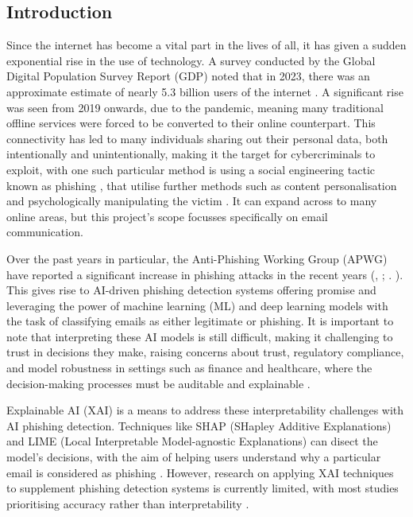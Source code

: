 
\subsection*{Introduction}

Since the internet has become a vital part in the lives of all, it has given a sudden exponential rise in the use of technology. A survey conducted by the Global Digital Population Survey Report (GDP) noted that in 2023, there was an approximate estimate of nearly 5.3 billion users of the internet \citep{kemp2022digital}. A significant rise was seen from 2019 onwards, due to the pandemic, meaning many traditional offline services were forced to be converted to their online counterpart. This connectivity has led to many individuals sharing out their personal data, both intentionally and unintentionally, making it the target for cybercriminals to exploit, with one such particular method is using a social engineering tactic known as phishing \citep{zahra2022detecting}, that utilise further methods such as content personalisation and psychologically manipulating the victim \citep{jagatic2007social}. It can expand across to many online areas, but this project's scope focusses specifically on email communication.\newline 

\noindent Over the past years in particular, the Anti-Phishing Working Group (APWG) have reported a significant increase in phishing attacks in the recent years (\citeauthor{chirra2020ai}, \citeyear{chirra2020ai}; \citeauthor{syed2018ensuring}. \citeyear{syed2018ensuring}). This gives rise to AI-driven phishing detection systems offering promise and leveraging the power of machine learning (ML) and deep learning models with the task of classifying emails as either legitimate or phishing. It is important to note that interpreting these AI models is still difficult, making it challenging to trust in decisions they make, raising concerns about trust, regulatory compliance, and model robustness in settings such as finance and healthcare, where the decision-making processes must be auditable and explainable \citep{jain2022survey}.\newline

\noindent Explainable AI (XAI) is a means to address these interpretability challenges with AI phishing detection. Techniques like SHAP (SHapley Additive Explanations) and LIME (Local Interpretable Model-agnostic Explanations) can disect the model's decisions, with the aim of helping users understand why a particular email is considered as phishing \citep{lundberg2017unified}. However, research on applying XAI techniques to supplement phishing detection systems is currently limited, with most studies prioritising accuracy rather than interpretability \citep{ribeiro2016model}.\newline

